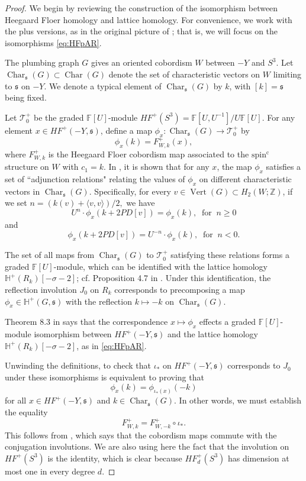 \documentclass[11 pt]{amsart}
\theoremstyle{remark}
\newcommand\Z{\mathbb{Z}}
\def\spinc {{\operatorname{spin^c}}}
\def\s{\mathfrak s}
\def\Tower{\mathcal{T}^+}
\def\ff {{\mathbb{F}}}
\def\He{\mathbb{H}}
\def\HF {\mathit{HF}}
\newcommand\HFp {\HF^+}
\def\inv{\iota}
\def\Vert{\operatorname{Vert}}
\def\Char{\operatorname{Char}}
\begin{document}
\begin{proof}
We begin by reviewing the construction of the isomorphism between Heegaard Floer homology and lattice homology. For convenience, we work with the plus versions, as in the original picture of \cite{Plumbed, NemethiOS}; that is, we will focus on the isomorphisms \eqref{eq:HFpAR}. 
 
The plumbing graph $G$ gives an oriented cobordism $W$ between $-Y$ and $S^3$. 
Let $\Char_\s(G) \subset \Char(G)$ denote the set of characteristic vectors on $W$ limiting to $\s$ on $-Y$. We denote a typical element of $\Char_\s(G)$ by $k$, with $[k] = \s$ being fixed.

Let $\Tower_0$ be the graded $\ff[U]$-module $\HFp(S^3) = \ff[U, U^{-1}]/U\ff[U]$. For any element $x \in \HFp(-Y, \s)$, define a map $\phi_x: \Char_\s(G) \rightarrow \Tower_0$ by
\[
\phi_x(k) = F^+_{W, k} (x),
\]
where $F^+_{W, k}$ is the Heegaard Floer cobordism map associated to the $\spinc$ structure on $W$ with $c_1= k$. In \cite{Plumbed}, it is shown that for any $x$, the map $\phi_x$ satisfies a set of ``adjunction relations" relating the values of $\phi_x$ on different characteristic vectors in $\Char_\s(G)$. Specifically, 
for every $v \in \Vert(G) \subset H_2(W; \Z)$, if we set $n=(k(v) + \langle v, v \rangle)/2,$ we have
\[
U^n \cdot \phi_x(k + 2PD[v]) = \phi_x(k), \ \text{ for } \ n \geq 0
\]
and
\[
 \phi_x(k + 2PD[v]) = U^{-n} \cdot \phi_x(k), \ \text{ for } \ n < 0.
\]

The set of all maps from $\Char_\s(G)$ to $\Tower_0$ satisfying these relations forms a graded $\ff[U]$-module, which can be identified with the lattice homology $\He^+(R_k)[-\sigma-2]$; cf. Proposition 4.7 in \cite{NemethiOS}. Under this identification, the reflection involution $J_0$ on $R_k$ corresponds to 
precomposing a map $\phi_x \in \mathbb{H}^+(G, \s)$ with the reflection $k \mapsto -k$ on $\Char_\s(G)$. 

Theorem 8.3 in \cite{NemethiOS} says that the correspondence $x \mapsto \phi_x$ effects a graded $\ff[U]$-module isomorphism between $\HFp(-Y, \s)$ and the lattice homology $\He^+(R_k)[-\sigma-2]$, as in \eqref{eq:HFpAR}. 

Unwinding the definitions, to check that $\inv_*$ on $\HFp(-Y, \s)$ corresponds to $J_0$ under these isomorphisms
 is equivalent to proving that
 $$\phi_{x}(k) = \phi_{\inv_*(x)}(-k)$$ for all $x \in \HFp(-Y, \s)$ and $k \in \Char_\s(G)$. In other words, we must establish the equality 
\[
F^+_{W, k} = F^+_{W,-k} \circ \inv_*.
\]
This follows from \cite[Theorem 3.6]{HolDiskFour}, which says that the cobordism maps commute with the conjugation involutions. We are also using here the fact that the involution on $\HFp(S^3)$ is the identity, which is clear because $\HFp_d(S^3)$ has dimension at most one in every degree $d$.


\end{proof}
\end{document}
